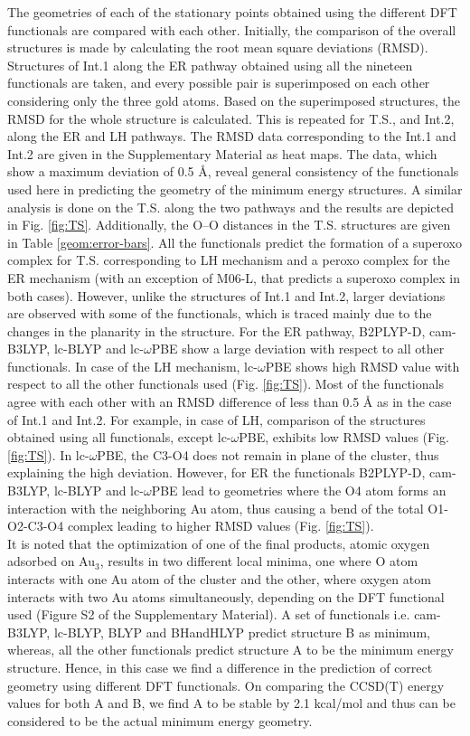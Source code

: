 The geometries of each of the stationary points obtained using the different DFT
functionals are compared with each other. Initially, the comparison of the overall structures is made by calculating the root mean square deviations (RMSD). Structures of Int.1 along the ER pathway obtained using all the nineteen functionals are taken, and every possible pair is superimposed on each other considering only the three gold atoms. Based on the superimposed structures, the RMSD for the whole structure is calculated. This is repeated for T.S., and Int.2, along the ER and LH pathways. The RMSD data corresponding to the Int.1 and Int.2 are given in the Supplementary Material as heat maps. The data, which show a maximum deviation of 0.5 \r{A}, reveal general consistency of the functionals used here in predicting the geometry of the minimum energy structures. A similar analysis is done on the T.S. along the two pathways and the results are depicted in Fig. \ref{fig:TS}. Additionally, the O--O distances in the T.S. structures are given in Table \ref{geom:error-bars}. All the functionals predict the formation of a superoxo complex for T.S. corresponding to LH mechanism and a peroxo complex for the ER mechanism (with an exception of M06-L, that predicts a superoxo complex in both cases). However, unlike the structures of Int.1 and Int.2, larger deviations are observed with some of the functionals, which is traced mainly due to the changes in the planarity in the structure. For the ER pathway, B2PLYP-D, cam-B3LYP, lc-BLYP and lc-$\omega$PBE show a large deviation with respect to all other functionals.  In case of the LH mechanism, lc-$\omega$PBE shows high RMSD value with respect to all the other functionals used (Fig. \ref{fig:TS}). Most of the functionals agree with each other with an RMSD difference of less than 0.5 \r{A} as in the case of Int.1 and Int.2. For example, in case of LH, comparison of the structures obtained using all functionals, except lc-$\omega$PBE, exhibits low RMSD values (Fig. \ref{fig:TS}). In lc-$\omega$PBE, the C3-O4 does not remain in plane of the cluster, thus explaining the high deviation. However, for ER the functionals B2PLYP-D, cam-B3LYP, lc-BLYP and lc-$\omega$PBE lead to geometries where the O4 atom forms an interaction with the neighboring Au atom, thus causing a bend of the total O1-O2-C3-O4 complex leading to higher RMSD values (Fig. \ref{fig:TS}). \\
It is noted that the optimization of one of the final products, atomic oxygen adsorbed on Au$_3$, results in two different local minima, one where O atom interacts with one Au atom of the cluster and the other, where oxygen atom interacts with two Au atoms simultaneously, depending on the DFT functional used (Figure S2 of the Supplementary Material). A set of functionals i.e. cam-B3LYP, lc-BLYP, BLYP and BHandHLYP predict structure B as minimum, whereas, all the other functionals predict structure A to be the minimum energy structure. Hence, in this case we find a difference in the prediction of correct geometry using different DFT functionals. On comparing the CCSD(T) energy values for both A and B, we find A to be stable by 2.1 kcal/mol and thus can be considered to be the actual minimum energy geometry.

